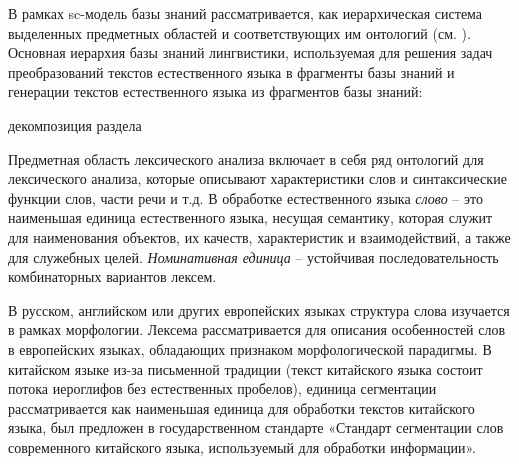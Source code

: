 В рамках  sc-модель базы знаний рассматривается, как иерархическая система выделенных предметных областей и соответствующих им онтологий (см. ). Основная иерархия базы знаний лингвистики, используемая для решения задач преобразований текстов естественного языка в фрагменты базы знаний и генерации текстов естественного языка из фрагментов базы знаний:
\begin{SCn}
	\begin{scnrelfromset}{декомпозиция раздела}
	\end{scnrelfromset}
\end{SCn}

Предметная область лексического анализа включает в себя ряд онтологий для лексического анализа, которые описывают характеристики слов и синтаксические функции слов, части речи и т.д. В обработке естественного языка \textit{слово} -- это наименьшая единица естественного языка, несущая семантику, которая служит для наименования объектов, их качеств, характеристик и взаимодействий, а также для служебных целей. \textit{Номинативная единица} -- устойчивая последовательность комбинаторных вариантов лексем.
\begin{SCn}
\end{SCn} 

В русском, английском или других европейских языках структура слова изучается в рамках морфологии. Лексема рассматривается для описания особенностей слов в европейских языках, обладающих признаком морфологической парадигмы. В китайском языке из-за письменной традиции (текст китайского языка состоит потока иероглифов без естественных пробелов), единица сегментации рассматривается как наименьшая единица для обработки текстов китайского языка, был предложен в государственном стандарте «Стандарт сегментации слов современного китайского языка, используемый для обработки информации». 
\begin{SCn}
\end{SCn}


